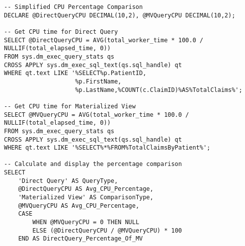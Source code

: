 \begin{lstlisting}[style=sqlstyle, caption={Materialized view creation}, label=lst:cpu_factors]
-- Simplified CPU Percentage Comparison
DECLARE @DirectQueryCPU DECIMAL(10,2), @MVQueryCPU DECIMAL(10,2);

-- Get CPU time for Direct Query
SELECT @DirectQueryCPU = AVG(total_worker_time * 100.0 / NULLIF(total_elapsed_time, 0))
FROM sys.dm_exec_query_stats qs
CROSS APPLY sys.dm_exec_sql_text(qs.sql_handle) qt
WHERE qt.text LIKE '%SELECT%p.PatientID,
                    %p.FirstName,
                    %p.LastName,%COUNT(c.ClaimID)%AS%TotalClaims%';

-- Get CPU time for Materialized View
SELECT @MVQueryCPU = AVG(total_worker_time * 100.0 / NULLIF(total_elapsed_time, 0))
FROM sys.dm_exec_query_stats qs
CROSS APPLY sys.dm_exec_sql_text(qs.sql_handle) qt
WHERE qt.text LIKE '%SELECT%*%FROM%TotalClaimsByPatient%';

-- Calculate and display the percentage comparison
SELECT 
    'Direct Query' AS QueryType,
    @DirectQueryCPU AS Avg_CPU_Percentage,
    'Materialized View' AS ComparisonType,
    @MVQueryCPU AS Avg_CPU_Percentage,
    CASE 
        WHEN @MVQueryCPU = 0 THEN NULL
        ELSE (@DirectQueryCPU / @MVQueryCPU) * 100 
    END AS DirectQuery_Percentage_Of_MV
\end{lstlisting}